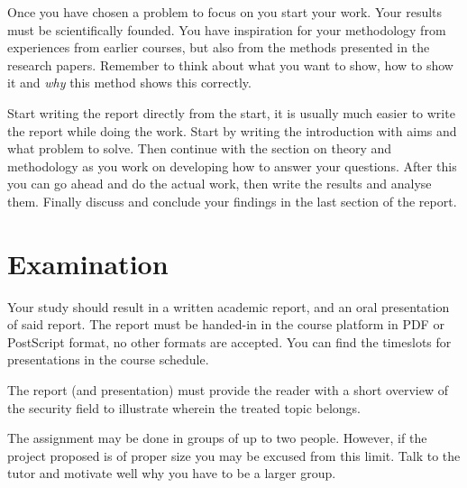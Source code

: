 \documentclass[a4paper]{llncs}
\begin{document}
Once you have chosen a problem to focus on you start your work.
Your results must be scientifically founded.
You have inspiration for your methodology from experiences from earlier 
courses, but also from the methods presented in the research papers.
Remember to think about what you want to show, how to show it and \emph{why} 
this method shows this correctly.

Start writing the report directly from the start, it is usually much easier to 
write the report while doing the work.
Start by writing the introduction with aims and what problem to solve.
Then continue with the section on theory and methodology as you work on 
developing how to answer your questions.
After this you can go ahead and do the actual work, then write the results and 
analyse them.
Finally discuss and conclude your findings in the last section of the report.


\section{Examination}
\label{sec:exam}
Your study should result in a written academic report, and an oral presentation 
of said report.
The report must be handed-in in the course platform in PDF or PostScript 
format, no other formats are accepted.
You can find the timeslots for presentations in the course schedule.

The report (and presentation) must provide the reader with a short overview of 
the security field to illustrate wherein the treated topic belongs.

The assignment may be done in groups of up to two people.
However, if the project proposed is of proper size you may be excused from this 
limit.
Talk to the tutor and motivate well why you have to be a larger group.


\printbibliography{}
\end{document}
